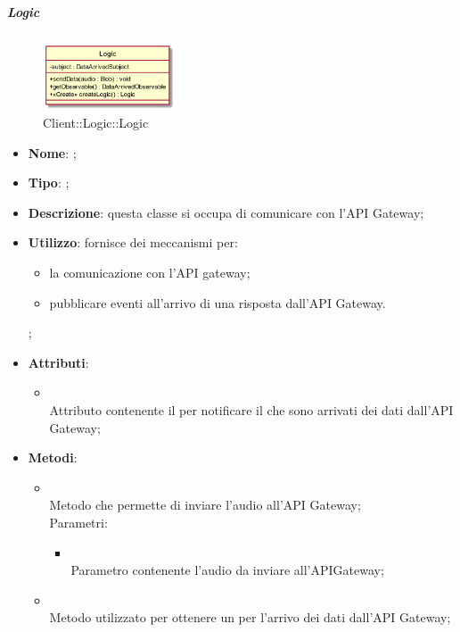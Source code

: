 \hypertarget{Logic_label}{\subparagraph{Logic}}
\begin{figure}[h]
	\centering
	\includegraphics[width=0.35\textwidth,height=\textheight,keepaspectratio]{images/ClassLogic.png}
	\caption{Client::Logic::Logic}
\end{figure}
\begin{itemize}
	\item \textbf{Nome}: ;
	\item \textbf{Tipo}: ;
	\item \textbf{Descrizione}: questa classe si occupa di comunicare con l'API Gateway;
	\item \textbf{Utilizzo}: fornisce dei meccanismi per:
\begin{itemize}
\item la comunicazione con l'API gateway;
\item pubblicare eventi all'arrivo di una risposta dall'API Gateway.
\end{itemize};
	\item \textbf{Attributi}:
	\begin{itemize}
		\item[]  \\
		Attributo contenente il  per notificare il  che sono arrivati dei dati dall'API Gateway;
	\end{itemize}
	\item \textbf{Metodi}:
	\begin{itemize}
		\item[]  \\		Metodo che permette di inviare l'audio all'API Gateway;\\
		Parametri:
		\begin{itemize}
			\item {} \\
			Parametro contenente l'audio da inviare all'APIGateway;
		\end{itemize}
		\item[]  \\		Metodo utilizzato per ottenere un  per l'arrivo dei dati dall'API Gateway;\\

\end{itemize}
\end{itemize}
